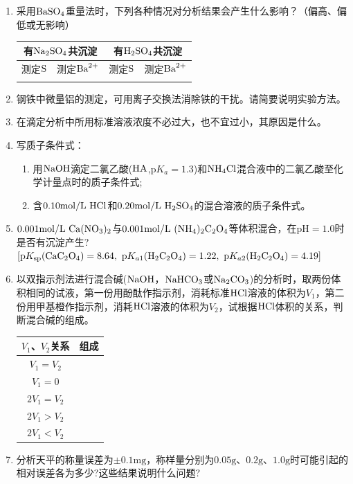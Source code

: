\begin{enumerate}[label=\arabic*., itemsep=1.5ex]
    \item 采用$\ce{BaSO4}$重量法时，下列各种情况对分析结果会产生什么影响？（偏高、偏低或无影响）
    \begin{center}
    \begin{tabular}{|c|c|c|c|}
    \hline
    \multicolumn{2}{|c|}{有$\ce{Na2SO4}$共沉淀} & \multicolumn{2}{c|}{有$\ce{H2SO4}$共沉淀} \\
    \hline
    测定$\ce{S}$ & 测定$\ce{Ba^{2+}}$ & 测定$\ce{S}$ & 测定$\ce{Ba^{2+}}$ \\
    \hline
     &  &  &  \\
    \hline
    \end{tabular}
    \end{center}
    \item 钢铁中微量铝的测定，可用离子交换法消除铁的干扰。请简要说明实验方法。
    \item 在滴定分析中所用标准溶液浓度不必过大，也不宜过小，其原因是什么。
    \item 写质子条件式：
    \begin{enumerate}[label=(\arabic*), noitemsep, topsep=0pt, partopsep=0pt]
        \item 用$\ce{NaOH}$滴定二氯乙酸($\ce{HA}$,$\mathrm{p}K_a=1.3$)和$\ce{NH4Cl}$混合液中的二氯乙酸至化学计量点时的质子条件式;
        \item 含$0.10\mathrm{mol/L}\ \ce{HCl}$和$0.20\mathrm{mol/L}\ \ce{H2SO4}$的混合溶液的质子条件式。
    \end{enumerate}
    \item $0.001\mathrm{mol/L}\ \ce{Ca(NO3)2}$与$0.001\mathrm{mol/L}\ \ce{(NH4)2C2O4}$等体积混合，在$\mathrm{pH}=1.0$时是否有沉淀产生?
    \\
    $\left[\mathrm{p}K_{\mathrm{sp}}(\ce{CaC2O4})=8.64,\ \mathrm{p}K_{a1}(\ce{H2C2O4})=1.22,\ \mathrm{p}K_{a2}(\ce{H2C2O4})=4.19\right]$
    \item 以双指示剂法进行混合碱($\ce{NaOH}$，$\ce{NaHCO3}$或$\ce{Na2CO3}$)的分析时，取两份体积相同的试液，第一份用酚酞作指示剂，消耗标准$\ce{HCl}$溶液的体积为$V_1$，第二份用甲基橙作指示剂，消耗$\ce{HCl}$溶液的体积为$V_2$，试根据$\ce{HCl}$体积的关系，判断混合碱的组成。
    \begin{center}
    \begin{tabular}{|c|p{6cm}|}
    \hline
    $V_1$、$V_2$关系 & 组成 \\
    \hline
    $V_1=V_2$ &  \\
    \hline
    $V_1=0$ &  \\
    \hline
    $2V_1=V_2$ &  \\
    \hline
    $2V_1>V_2$ &  \\
    \hline
    $2V_1<V_2$ &  \\
    \hline
    \end{tabular}
    \end{center}
    \item 分析天平的称量误差为$\pm0.1\mathrm{mg}$，称样量分别为$0.05\mathrm{g}$、$0.2\mathrm{g}$、$1.0\mathrm{g}$时可能引起的相对误差各为多少?这些结果说明什么问题?
\end{enumerate}

